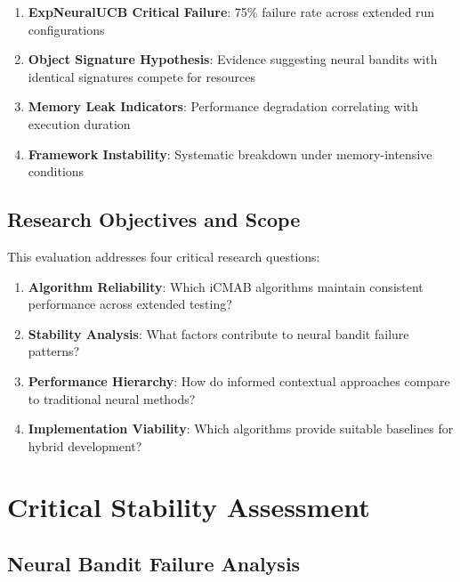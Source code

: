\documentclass[12pt,a4paper]{article}
\begin{document}
\begin{enumerate}
\item \textbf{ExpNeuralUCB Critical Failure}: 75\% failure rate across extended run configurations
\item \textbf{Object Signature Hypothesis}: Evidence suggesting neural bandits with identical signatures compete for resources
\item \textbf{Memory Leak Indicators}: Performance degradation correlating with execution duration
\item \textbf{Framework Instability}: Systematic breakdown under memory-intensive conditions
\end{enumerate}

\subsection{Research Objectives and Scope}

This evaluation addresses four critical research questions:

\begin{enumerate}
\item \textbf{Algorithm Reliability}: Which iCMAB algorithms maintain consistent performance across extended testing?
\item \textbf{Stability Analysis}: What factors contribute to neural bandit failure patterns?
\item \textbf{Performance Hierarchy}: How do informed contextual approaches compare to traditional neural methods?
\item \textbf{Implementation Viability}: Which algorithms provide suitable baselines for hybrid development?
\end{enumerate}

\section{Critical Stability Assessment}

\subsection{Neural Bandit Failure Analysis}
\end{document}
